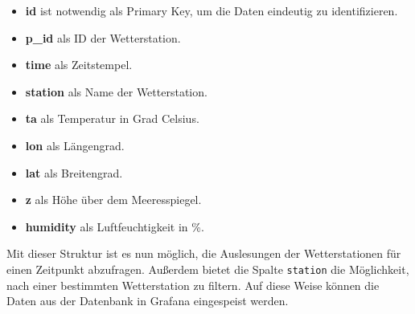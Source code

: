 \begin{itemize}
    \item \textbf{id} ist notwendig als Primary Key, um die Daten eindeutig zu identifizieren.
    \item \textbf{p\_id} als ID der Wetterstation.
    \item \textbf{time} als Zeitstempel.
    \item \textbf{station} als Name der Wetterstation.
    \item \textbf{ta} als Temperatur in Grad Celsius.
    \item \textbf{lon} als Längengrad.
    \item \textbf{lat} als Breitengrad.
    \item \textbf{z} als Höhe über dem Meeresspiegel.
    \item \textbf{humidity} als Luftfeuchtigkeit in \%.
\end{itemize}

Mit dieser Struktur ist es nun möglich, die Auslesungen der Wetterstationen für einen Zeitpunkt abzufragen. Außerdem bietet die Spalte \texttt{station} die Möglichkeit, nach einer bestimmten Wetterstation zu filtern. Auf diese Weise können die Daten aus der Datenbank in Grafana eingespeist werden.

\label{sec:backend}